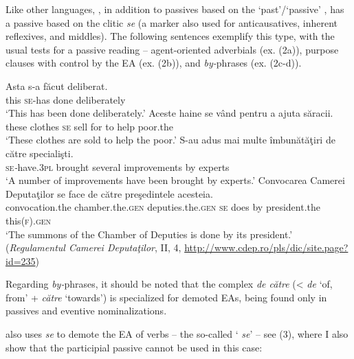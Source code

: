 \documentclass[output=paper]{langsci/langscibook}
\begin{document}
Like other  languages, , in addition to passives based on the ‘past'/‘passive' , has a passive based on the  clitic \textit{se} (a marker also used for anticausatives, inherent reflexives, and middles). The following sentences exemplify this type, with the usual tests for a passive reading – agent-oriented adverbials (ex. (2a)), purpose clauses with control by the EA (ex. (2b)), and \textit{by-}phrases (ex. (2c-d)).   

\ea%
    \label{ex:giurgea:2}%
    \ea
    \gll Asta s-a      făcut deliberat.\\
         this  \textsc{se}{}-has done  deliberately\\
    \glt ‘This has been done deliberately.’
    \ex
    \gll Aceste haine   se vând pentru a ajuta săracii.\\
         these   clothes \textsc{se} sell   for      to help poor.the\\
    \glt  ‘These clothes are sold to help the poor.’
    \ex
    \gll S{}-au              adus     {mai multe} îmbunătăţiri    {de către} specialişti.\\
         \textsc{se}\textit{{}-}have.\textsc{3pl} brought several      improvements by         experts\\
    \glt ‘A number of improvements have been brought by experts.’
    \ex
    \gll Convocarea      Camerei                Deputaţilor           se  face {de către} preşedintele  acesteia.\\
         convocation.the chamber.the.\textsc{gen} deputies.the.\textsc{gen}  \textsc{se} does by    president.the this(\textsc{f).gen}\\
    \glt ‘The summons of the Chamber of Deputies is done by its president.’\\
    (\textit{Regulamentul Camerei Deputaţilor}, II, 4, \url{http://www.cdep.ro/pls/dic/site.page?id=235})\\
    \z
\z

Regarding \textit{by-}phrases, it should be noted that the complex  \textit{de către} (< \textit{de} ‘of, from’ + \textit{către} ‘towards’) is specialized for demoted EAs, being found only in passives and eventive nominalizations.

 also uses \textit{se} to demote the EA of  verbs – the so-called ‘ \textit{se}' – see (3), where I also show that the participial passive cannot be used in this case:
\end{document}
